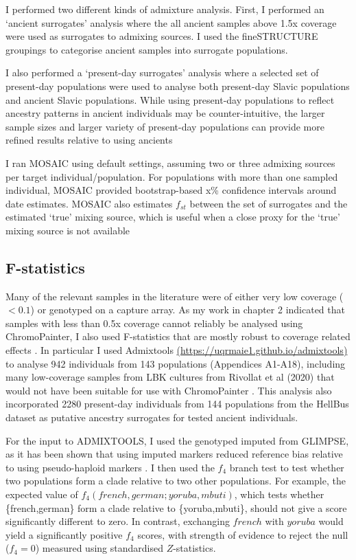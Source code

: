 I performed two different kinds of admixture analysis. First, I performed an `ancient surrogates' analysis where the all ancient samples above 1.5x coverage were used as surrogates to admixing sources. I used the fineSTRUCTURE groupings to categorise ancient samples into surrogate populations. 

I also performed a `present-day surrogates' analysis where a selected set of present-day populations were used to analyse both present-day Slavic populations and ancient Slavic populations. While using present-day populations to reflect ancestry patterns in ancient individuals may be counter-intuitive, the larger sample sizes and larger variety of present-day populations can provide more refined results relative to using ancients

I ran MOSAIC using default settings, assuming two or three admixing sources per target individual/population. For populations with more than one sampled individual, MOSAIC provided bootstrap-based x\% confidence intervals around date estimates. MOSAIC also estimates $f_{st}$ between the set of surrogates and the estimated `true' mixing source, which is useful when a close proxy for the `true' mixing source is not available

\subsection{F-statistics}

Many of the relevant samples in the literature were of either very low coverage ($<0.1$) or genotyped on a capture array. As my work in chapter 2 indicated that samples with less than 0.5x coverage cannot reliably be analysed using ChromoPainter, I also used F-statistics \cite{Patterson2012} that are mostly robust to coverage related effects \cite{AssessingqpAdm}. In particular I used Admixtools \url{(https://uqrmaie1.github.io/admixtools)} to analyse 942 individuals from 143 populations (Appendices A1-A18), including many low-coverage samples from LBK cultures from Rivollat et al (2020) that would not have been suitable for use with ChromoPainter \cite{rivollat2020france}. This analysis also incorporated 2280 present-day individuals from 144 populations from the HellBus dataset as putative ancestry surrogates for tested ancient individuals. 

For the input to ADMIXTOOLS, I used the genotyped imputed from GLIMPSE, as it has been shown that using imputed markers reduced reference bias relative to using pseudo-haploid markers \cite{Martiniano2017}. I then used the $f_{4}$ branch test to test whether two populations form a clade relative to two other populations. For example, the expected value of $f_{4}(french,german;yoruba,mbuti)$, which tests whether \{french,german\} form a clade relative to \{yoruba,mbuti\}, should not give a score significantly different to zero. In contrast, exchanging $french$ with $yoruba$ would yield a significantly positive $f_4$ scores, with strength of evidence to reject the null ($f_4 = 0$) measured using standardised $Z$-statistics.

